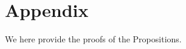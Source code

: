\section*{Appendix}
\label{sec:appendix}
We here provide the proofs of the Propositions.





        


